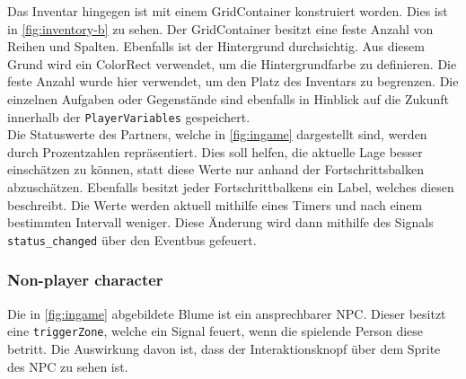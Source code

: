 Das Inventar hingegen ist mit einem GridContainer konstruiert worden\cite{godot-gridcontainer}. Dies ist in \autoref{fig:inventory-b} zu sehen. Der GridContainer besitzt eine feste Anzahl von Reihen und Spalten. Ebenfalls ist der Hintergrund durchsichtig. Aus diesem Grund wird ein ColorRect verwendet, um die Hintergrundfarbe zu definieren\cite{godot-colorrect}. Die feste Anzahl wurde hier verwendet, um den Platz des Inventars zu begrenzen. Die einzelnen Aufgaben oder Gegenstände sind ebenfalls in Hinblick auf die Zukunft innerhalb der \texttt{PlayerVariables} gespeichert.\\ 

Die Statuswerte des Partners, welche in \autoref{fig:ingame} dargestellt sind, werden durch Prozentzahlen repräsentiert. Dies soll helfen, die aktuelle Lage besser einschätzen zu können, statt diese Werte nur anhand der Fortschrittsbalken abzuschätzen. Ebenfalls besitzt jeder Fortschrittbalkens ein Label, welches diesen beschreibt. Die Werte werden aktuell mithilfe eines Timers und nach einem bestimmten Intervall weniger. Diese Änderung wird dann mithilfe des Signals \texttt{status\_changed} über den Eventbus gefeuert. \\

\subsubsection{Non-player character}\label{sec:npc}
Die in \autoref{fig:ingame} abgebildete Blume ist ein ansprechbarer \ac{NPC}. Dieser besitzt eine \texttt{triggerZone}, welche ein Signal feuert, wenn die spielende Person diese betritt. Die Auswirkung davon ist, dass der Interaktionsknopf über dem Sprite des \ac{NPC} zu sehen ist. \\


